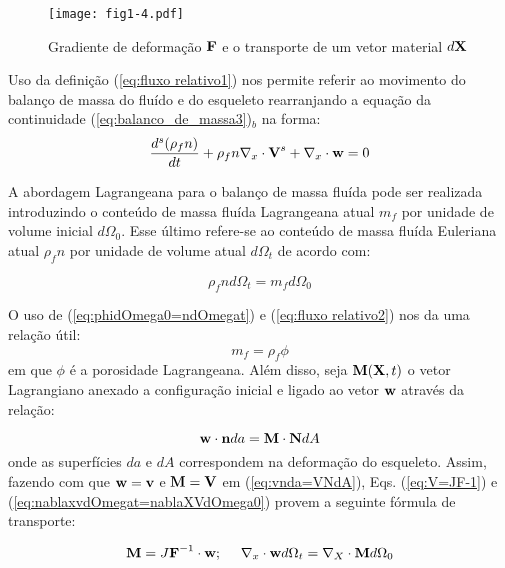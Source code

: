 \documentclass[
	11pt, %
	fleqn, %
	a4paper, %
]{LegrandOrangeBook}
\begin{document}
\begin{figure}[H] %
	\centering %
	\texttt{[image: fig1-4.pdf]} %
	\caption{Gradiente de deformação $\textbf{F}$ e o transporte de um vetor material $d\textbf{X}$}
	\label{fig:fig1-4.pdf} %
\end{figure}

Uso da definição (\ref{eq:fluxo relativo1}) nos permite referir ao movimento do balanço de massa do fluído e do esqueleto rearranjando a equação da continuidade (\ref{eq:balanco_de_massa3})$_b$ na forma:
\begin{equation}
	\label{eq:fluxo relativo1}	
	\dfrac{d^s(\rho_fn)}{dt}+\rho_fn\nabla_x \cdot \textbf{V}^s + \nabla_x \cdot \textbf{w} = 0 
\end{equation}

A abordagem Lagrangeana para o balanço de massa fluída pode ser realizada introduzindo o conteúdo de massa fluída Lagrangeana atual $m_f$ por unidade de volume inicial $d\Omega_0$. Esse último refere-se ao conteúdo de massa fluída Euleriana atual $\rho_fn$ por unidade de volume atual $d\Omega_t$ de acordo com:

\begin{equation}
	\label{eq:fluxo relativo2}	
	\rho_f n d\Omega_t = m_f d\Omega_0
\end{equation}

O uso de (\ref{eq:phidOmega0=ndOmegat}) e (\ref{eq:fluxo relativo2}) nos da uma relação útil:
\begin{equation}
	\label{eq:fluxo relativo3}	
	m_f = \rho_f \phi
\end{equation}
em que $\phi$ é a porosidade Lagrangeana. Além disso, seja $\textbf{M}(\textbf{X},t)$ o vetor Lagrangiano anexado a configuração inicial e ligado ao vetor $\textbf{w}$ através da relação:

\begin{equation}
	\label{eq:fluxo relativo3}	
	\textbf{w} \cdot \textbf{n} da = \textbf{M} \cdot \textbf{N} dA
\end{equation}
onde as superfícies $da$ e $dA$ correspondem na deformação do esqueleto. Assim, fazendo com que $\textbf{w}=\textbf{v}$ e $\textbf{M} = \textbf{V}$ em (\ref{eq:vnda=VNdA}), Eqs. (\ref{eq:V=JF-1}) e (\ref{eq:nablaxvdOmegat=nablaXVdOmega0}) provem a seguinte fórmula de transporte:

\begin{equation}
	\label{eq:fluxo relativo4}	
	\textbf{M} = J\textbf{F}^{-1} \cdot \textbf{w};~~~~ \nabla_x \cdot \textbf{w} d\Omega_t = \nabla_X \cdot \textbf{M} d\Omega_0
\end{equation}
\end{document}
